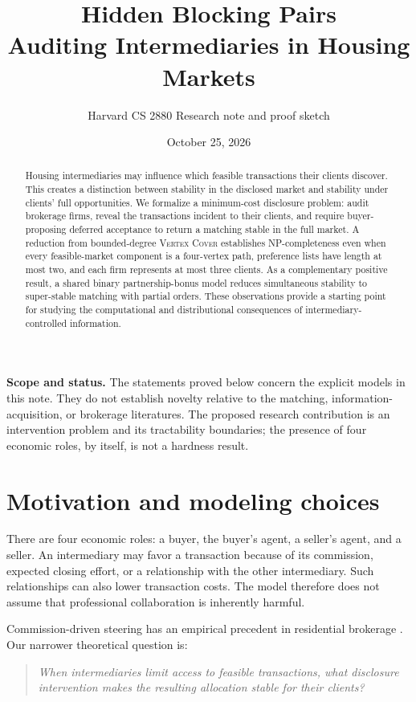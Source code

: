 \documentclass[11pt,letterpaper]{article}
\title{\vspace{-1.5em}\textbf{Hidden Blocking Pairs}\\[4pt]
  \large Auditing Intermediaries in Housing Markets}
\author{\normalsize Harvard CS 2880 \quad Research note and proof sketch}
\date{\normalsize October 25, 2026}
\theoremstyle{definition}
\theoremstyle{remark}
\begin{document}
\maketitle
\vspace{-1.4em}

\begin{abstract}
Housing intermediaries may influence which feasible transactions their clients
discover. This creates a distinction between stability in the disclosed market
and stability under clients' full opportunities. We formalize a minimum-cost
disclosure problem: audit brokerage firms, reveal the transactions incident to
their clients, and require buyer-proposing deferred acceptance to return a
matching stable in the full market. A reduction from bounded-degree
\textsc{Vertex Cover} establishes NP-completeness even when every feasible-market
component is a four-vertex path, preference lists have length at most two, and
each firm represents at most three clients. As a complementary positive result,
a shared binary partnership-bonus model reduces simultaneous stability to
super-stable matching with partial orders. These observations provide a starting
point for studying the computational and distributional consequences of
intermediary-controlled information.
\end{abstract}

\noindent\textbf{Scope and status.}
The statements proved below concern the explicit models in this note.
They do not establish novelty relative to the matching, information-acquisition,
or brokerage literatures. The proposed research contribution is an intervention
problem and its tractability boundaries; the presence of four economic roles,
by itself, is not a hardness result.

\section{Motivation and modeling choices}

There are four economic roles: a buyer, the buyer's agent, a seller's agent, and
a seller. An intermediary may favor a transaction because of its commission,
expected closing effort, or a relationship with the other intermediary. Such
relationships can also lower transaction costs. The model therefore does not
assume that professional collaboration is inherently harmful.

Commission-driven steering has an empirical precedent in residential brokerage
\cite{barwick2017}. Our narrower theoretical question is:
\begin{quote}
\emph{When intermediaries limit access to feasible transactions, what disclosure
intervention makes the resulting allocation stable for their clients?}
\end{quote}
\end{document}
